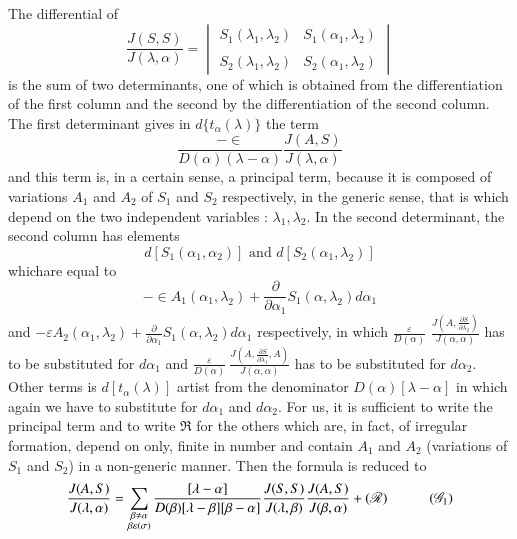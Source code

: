 The differential of 
$$
\frac{J(S, S)} {J(\lambda,  \alpha )} = \begin{vmatrix}  S_1
  (\lambda_1,  \lambda_2 ) & S_1 (\alpha_1,  \lambda_2 ) \\{} & {}
  \\ S_2 (\lambda_1,  \lambda_2 )  & S_2 (\alpha_1,
  \lambda_2) \end{vmatrix} 
$$
is the sum of two determinants, one of which is obtained from the
differentiation of the first column and the second by the
differentiation of the second column. The first determinant gives in
$d \{t_\alpha(\lambda)\}$ the term 
$$
\frac{- \in} {D(\alpha ) (\lambda - \alpha )} \frac{J(A, S)}
     {J(\lambda,  \alpha)} 
$$
and this term is, in a certain sense, a principal term, because it is
composed of variations $A_1$ and $A_2$ of $S_1$ and $S_2$
respectively, in the generic sense, that is which depend on the two
independent variables : $\lambda_1,  \lambda_2$. In the second
determinant, the second column has elements 
$$
d [ S_1 (\alpha_1,  \alpha_2 ) ] \text{ and } d [ S_2(\alpha_1,  \lambda_2 )]
$$
which\pageoriginale are equal to 
$$
- \in A_1 (\alpha_1,  \lambda_2 ) + \frac{\partial}{\partial \alpha_1}
S_1(\alpha,  \lambda_2 ) d \alpha_1 
$$
and $- \varepsilon  A_2 (\alpha_1,  \lambda_2)+ \frac{\partial}{\partial
  \alpha_1} S_1(\alpha,  \lambda_2) d \alpha_1 $ respectively, in
which $\frac{\varepsilon }{D(\alpha)}$  $\frac{J(A, \frac{\partial S}
  {\partial \lambda_2})} {J(\alpha, \alpha)}$ has to be substituted for
$d \alpha_1$ and $\frac{\varepsilon }{D(\alpha)} ~  \frac{J(A,
  \frac{\partial S} {\partial \lambda_1},  A)} {J(\alpha, \alpha)}$
has to be substituted for $d \alpha_2$. Other terms is $d[t_\alpha
  (\lambda )]$ artist from the denominator $D(\alpha )[\lambda -
  \alpha ]$ in which again we have to substitute for $d \alpha_1$ and
$d \alpha_2$. For us, it is sufficient to write the principal term
and to write $\mathfrak{R}$ for the others which are, in fact, of
irregular formation, depend on only, finite in number and contain
$A_1$ and $A_2$ (variations of $S_1$ and $S_2$) in a non-generic
manner. Then the formula is reduced to  
\begin{equation*}
\frac{J(A, S)}{J(\lambda,  \alpha)} = \sum_{\substack{\beta \neq
    \alpha \\ \beta \varepsilon  (\sigma)}} \frac{[\lambda - \alpha]}
     {D(\beta)[\lambda - \beta ] [\beta - \alpha ]}  \frac{J(S,
       S)}{J(\lambda,  \beta)} \frac{J(A, S)}{J(\beta,  \alpha)} +
     (\mathscr{R}) \quad \tag{$\mathscr{G}_1$}\label{part2:chap3:sec5:eqG1} 
\end{equation*}
